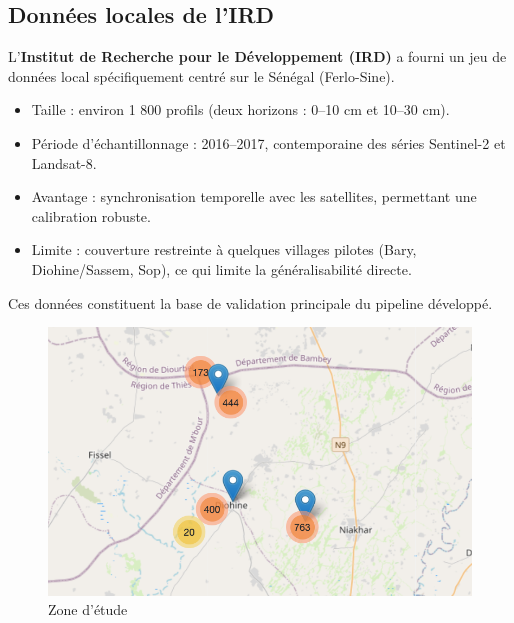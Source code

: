\documentclass[12pt,a4paper,oneside]{report}
\begin{document}
\subsection{Données locales de l’IRD}
L’\textbf{Institut de Recherche pour le Développement (IRD)} a fourni un jeu de données local spécifiquement centré sur le Sénégal (Ferlo-Sine).
\begin{itemize}
  \item Taille : environ 1 800 profils (deux horizons : 0–10 cm et 10–30 cm).

\item Période d’échantillonnage : 2016–2017, contemporaine des séries Sentinel-2 et Landsat-8.

\item Avantage : synchronisation temporelle avec les satellites, permettant une calibration robuste.

\item Limite : couverture restreinte à quelques villages pilotes (Bary, Diohine/Sassem, Sop), ce qui limite la généralisabilité directe.
\end{itemize}
Ces données constituent la base de validation principale du pipeline développé.
\begin{figure}[h]
    \centering
    \includegraphics[width=0.9\linewidth]{images/zone.png}
    \caption{Zone d'étude}
    \label{fig:zone}
\end{figure}
\end{document}
